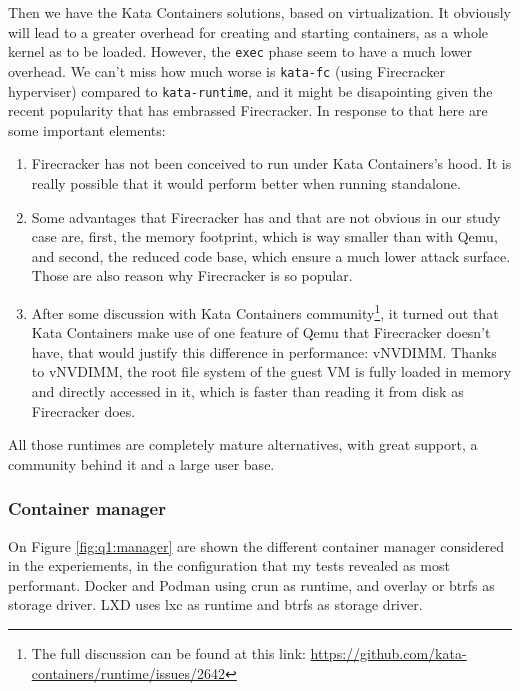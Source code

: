 Then we have the Kata Containers solutions, based on virtualization.  It obviously will lead to a greater overhead for creating and starting containers, as a whole kernel as to be loaded.  However, the \texttt{exec} phase seem to have a much lower overhead.  We can't miss how much worse is \texttt{kata-fc} (using Firecracker hyperviser) compared to \texttt{kata-runtime}, and it might be disapointing given the recent popularity that has embrassed Firecracker.  In response to that here are some important elements:
\begin{enumerate}
  \item Firecracker has not been conceived to run under Kata Containers's hood.  It is really possible that it would perform better when running standalone.
  \item Some advantages that Firecracker has and that are not obvious in our study case are, first, the memory footprint, which is way smaller than with Qemu, and second, the reduced code base, which ensure a much lower attack surface.  Those are also reason why Firecracker is so popular.
  \item After some discussion with Kata Containers community\footnote{The full discussion can be found at this link: \href{https://github.com/kata-containers/runtime/issues/2642}{https://github.com/kata-containers/runtime/issues/2642}}, it turned out that Kata Containers make use of one feature of Qemu that Firecracker doesn't have, that would justify this difference in performance: vNVDIMM.  Thanks to vNVDIMM, the root file system of the guest VM is fully loaded in memory and directly accessed in it, which is faster than reading it from disk as Firecracker does.
\end{enumerate}

All those runtimes are completely mature alternatives, with great support, a community behind it and a large user base.  

\subsubsection{Container manager}

On Figure \ref{fig:q1:manager} are shown the different container manager considered in the experiements, in the configuration that my tests revealed as most performant.  Docker and Podman using crun as runtime, and overlay or btrfs as storage driver.  LXD uses lxc as runtime and btrfs as storage driver.

